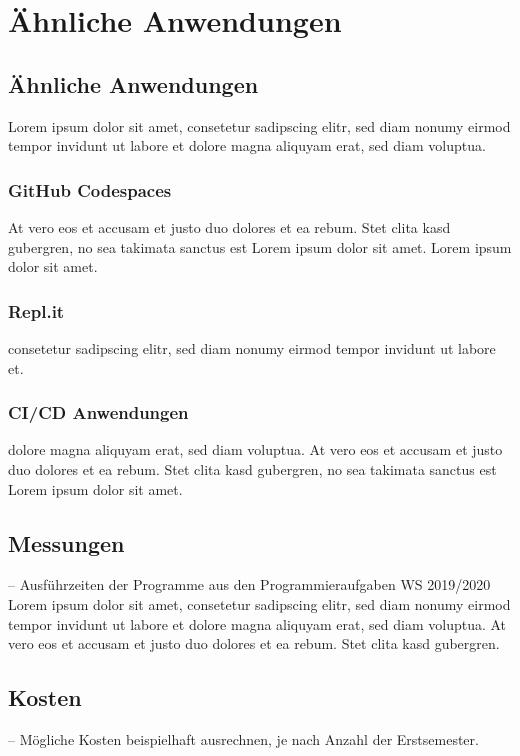 \chapter{Ähnliche Anwendungen}

\section{Ähnliche Anwendungen}
Lorem ipsum dolor sit amet, consetetur sadipscing elitr,
sed diam nonumy eirmod tempor invidunt ut labore et dolore magna
aliquyam erat, sed diam voluptua.

\subsection{GitHub Codespaces}
At vero eos et accusam et justo duo dolores et ea rebum. Stet clita kasd gubergren,
no sea takimata sanctus est Lorem ipsum dolor sit amet. Lorem ipsum dolor sit amet.

\subsection{Repl.it}
consetetur sadipscing elitr, sed diam nonumy eirmod tempor invidunt ut labore et.

\subsection{CI/CD Anwendungen}
dolore magna aliquyam erat, sed diam voluptua.
At vero eos et accusam et justo duo dolores et ea rebum.
Stet clita kasd gubergren, no sea takimata sanctus est Lorem ipsum dolor sit amet.

\section{Messungen}
-- Ausführzeiten der Programme aus den Programmieraufgaben WS 2019/2020
Lorem ipsum dolor sit amet, consetetur sadipscing elitr,
sed diam nonumy eirmod tempor invidunt ut labore et dolore magna
aliquyam erat, sed diam voluptua.
At vero eos et accusam et justo duo dolores et ea rebum. Stet clita kasd gubergren.

\section{Kosten}
-- Mögliche Kosten beispielhaft ausrechnen, je nach Anzahl der Erstsemester.

